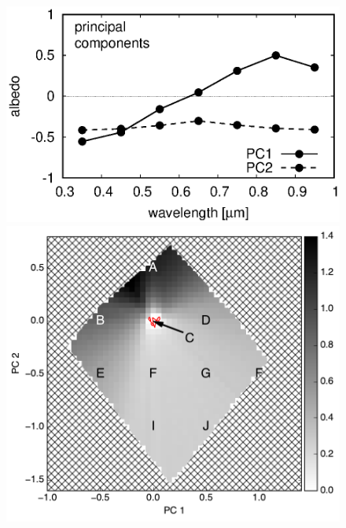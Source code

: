 \documentclass[iop,numberedappendix,apj]{emulateapj}
\begin{document}
\begin{figure}[tbh!]
    \begin{center}
	\includegraphics[width=0.85\hsize]{PCs_raddata_2_norm.eps}
	\includegraphics[width=0.88\hsize]{raddata_2_norm_noreg_ver2.pdf}

\end{center}
\end{figure}
\end{document}
